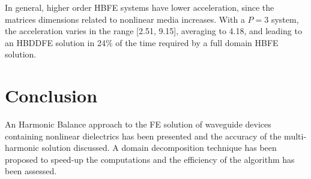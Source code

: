 \documentclass[journal]{IEEEtran}
\begin{document}
In general, higher order HBFE systems have lower acceleration, since the
matrices dimensions related to nonlinear media increases. With a
$P=3$ system, the acceleration varies in the range [2.51,
9.15], averaging to 4.18, and leading to an HBDDFE solution in 24\% of the
time required by a full domain HBFE solution.

\section{Conclusion}
An Harmonic Balance approach to the FE solution of 
waveguide devices containing nonlinear dielectrics has been 
presented and the accuracy of the multi-harmonic solution 
discussed. 
A domain decomposition technique has been proposed to speed-up the computations
and the efficiency of the algorithm has been assessed.






%








%
%
\end{document}
